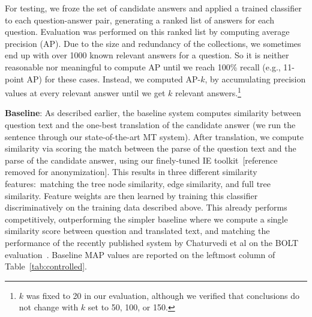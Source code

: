 \documentclass{sig-alternate-05-2015}
\begin{document}
For testing, we froze the set of candidate answers and applied a trained classifier to each question-answer pair, generating
a ranked list of answers for each question. Evaluation was performed on this ranked list by computing average precision (AP). 
Due to the size and redundancy of the collections, we sometimes end 
up with over 1000 known relevant answers for a question. So it is neither reasonable nor meaningful to compute AP until we
reach 100\% recall (e.g., 11-point AP) for these cases. Instead, we computed AP-$k$, by accumulating precision values 
at every relevant answer until we get $k$ relevant answers.\footnote{$k$ was fixed to 20 in our evaluation, although we
verified that conclusions do not change with $k$ set to 50, 100, or 150.} %

\textbf{Baseline}: As described earlier, the baseline system computes similarity between question text and the one-best 
translation of the candidate answer (we run the sentence through our state-of-the-art MT system). After translation, we 
compute similarity via scoring the match between the parse of the question text and the parse of the candidate answer, 
using our finely-tuned IE toolkit~[reference removed for anonymization].
This results in three different similarity features:\ matching the tree node similarity, 
edge similarity, and full tree similarity. Feature weights are then learned by training this classifier discriminatively on the 
training data described above. This already performs competitively, outperforming the simpler baseline where we compute 
a single similarity score between question and translated text, and matching the performance of the recently 
published system by Chaturvedi et al on the BOLT evaluation~\cite{Chaturvedi:2014aa}. Baseline MAP values are 
reported on the leftmost column of Table~\ref{tab:controlled}.
\end{document}
